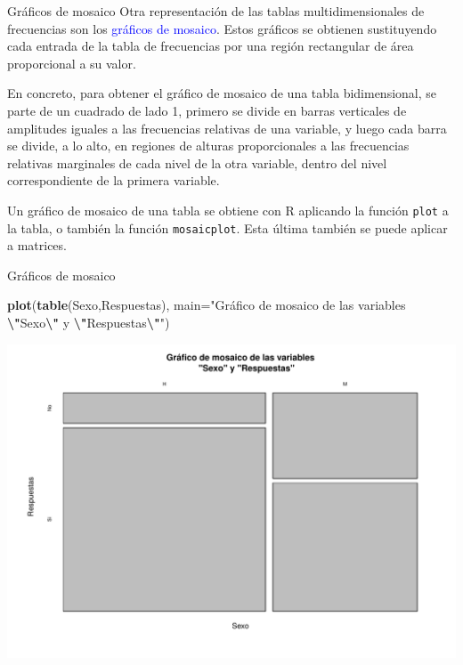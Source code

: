 \documentclass[
  ignorenonframetext,
]{beamer}
\newenvironment{Shaded}{\begin{snugshade}}{\end{snugshade}}
\newcommand{\AttributeTok}[1]{\textcolor[rgb]{0.13,0.29,0.53}{#1}}
\newcommand{\FunctionTok}[1]{\textcolor[rgb]{0.13,0.29,0.53}{\textbf{#1}}}
\newcommand{\NormalTok}[1]{#1}
\newcommand{\SpecialCharTok}[1]{\textcolor[rgb]{0.81,0.36,0.00}{\textbf{#1}}}
\newcommand{\StringTok}[1]{\textcolor[rgb]{0.31,0.60,0.02}{#1}}
\newcommand\blue[1]{\textcolor{blue}{#1}}
\begin{document}
\begin{frame}[fragile]{Gráficos de mosaico}
\label{gruxe1ficos-de-mosaico}
Otra representación de las tablas multidimensionales de frecuencias son
los \blue{gráficos de mosaico}. Estos gráficos se obtienen sustituyendo
cada entrada de la tabla de frecuencias por una región rectangular de
área proporcional a su valor.

En concreto, para obtener el gráfico de mosaico de una tabla
bidimensional, se parte de un cuadrado de lado 1, primero se divide en
barras verticales de amplitudes iguales a las frecuencias relativas de
una variable, y luego cada barra se divide, a lo alto, en regiones de
alturas proporcionales a las frecuencias relativas marginales de cada
nivel de la otra variable, dentro del nivel correspondiente de la
primera variable.

Un gráfico de mosaico de una tabla se obtiene con R aplicando la función
\texttt{plot} a la tabla, o también la función \texttt{mosaicplot}. Esta
última también se puede aplicar a matrices.
\end{frame}

\begin{frame}[fragile]{Gráficos de mosaico}
\label{gruxe1ficos-de-mosaico-1}
\begin{Shaded}
\begin{Highlighting}[]
\FunctionTok{plot}\NormalTok{(}\FunctionTok{table}\NormalTok{(Sexo,Respuestas), }\AttributeTok{main=}\StringTok{"Gráfico de mosaico de las variables}
\StringTok{     }\SpecialCharTok{\textbackslash{}"}\StringTok{Sexo}\SpecialCharTok{\textbackslash{}"}\StringTok{ y }\SpecialCharTok{\textbackslash{}"}\StringTok{Respuestas}\SpecialCharTok{\textbackslash{}"}\StringTok{"}\NormalTok{)}
\end{Highlighting}
\end{Shaded}

\includegraphics{R_base_files/figure-beamer/unnamed-chunk-94-1.pdf}
\end{frame}
\end{document}
